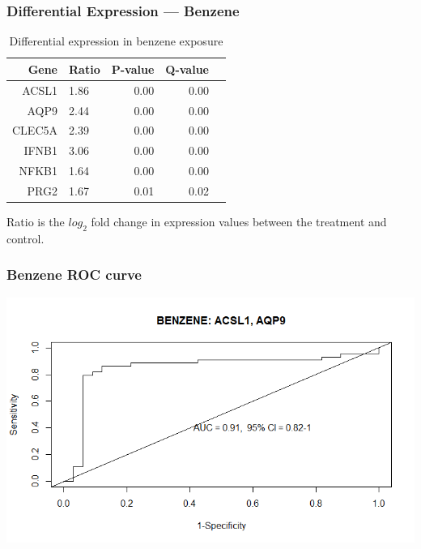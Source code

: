 \documentclass{beamer}
\begin{document}
\begin{frame}[fragile]
  	\frametitle{Differential Expression --- Benzene}
 		\begin{table}[ht]
		\caption {Differential expression in benzene exposure} \label{tab:benzene} 
		\centering
		\begin{tabular}{rlrrr}
  			\hline
 			Gene & Ratio & P-value & Q-value \\ 
  			\hline
			ACSL1 & 1.86 & 0.00 & 0.00 \\ 
  			AQP9 & 2.44 & 0.00 & 0.00 \\ 
  			CLEC5A & 2.39 & 0.00 & 0.00 \\ 
  			IFNB1 & 3.06 & 0.00 & 0.00 \\ 
  			NFKB1 & 1.64 & 0.00 & 0.00 \\ 
  			PRG2 & 1.67 & 0.01 & 0.02 \\ 
   			\hline
		\end{tabular}
		\end{table}
		\small Ratio is the $log_{2}$ fold change in expression values between the treatment and control. 
\end{frame}

\begin{frame}
	 \frametitle{Benzene ROC curve}
		\centering
	 	\includegraphics[scale=0.45]{../paper/figs/benzene1.png} 
\end{frame}
\end{document}
